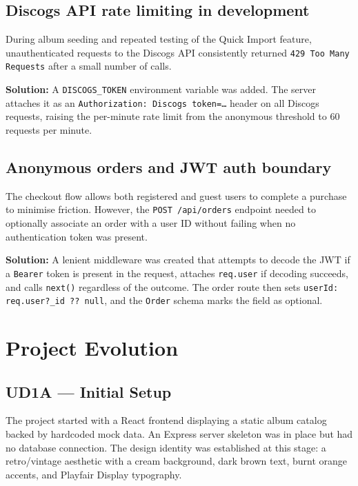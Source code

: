 \documentclass[11pt, a4paper]{report}
\begin{document}
\section{Discogs API rate limiting in development}

During album seeding and repeated testing of the Quick Import feature, unauthenticated requests to the Discogs API consistently returned \texttt{429 Too Many Requests} after a small number of calls.

\textbf{Solution:} A \texttt{DISCOGS\_TOKEN} environment variable was added. The server attaches it as an \texttt{Authorization: Discogs token=\ldots} header on all Discogs requests, raising the per-minute rate limit from the anonymous threshold to 60 requests per minute.

\section{Anonymous orders and JWT auth boundary}

The checkout flow allows both registered and guest users to complete a purchase to minimise friction. However, the \texttt{POST /api/orders} endpoint needed to optionally associate an order with a user ID without failing when no authentication token was present.

\textbf{Solution:} A lenient middleware was created that attempts to decode the JWT if a \texttt{Bearer} token is present in the request, attaches \texttt{req.user} if decoding succeeds, and calls \texttt{next()} regardless of the outcome. The order route then sets \texttt{userId: req.user?\_id ?? null}, and the \texttt{Order} schema marks the field as optional.

\chapter{Project Evolution}

\section{UD1A — Initial Setup}

The project started with a React frontend displaying a static album catalog backed by hardcoded mock data. An Express server skeleton was in place but had no database connection. The design identity was established at this stage: a retro/vintage aesthetic with a cream background, dark brown text, burnt orange accents, and Playfair Display typography.
\end{document}
